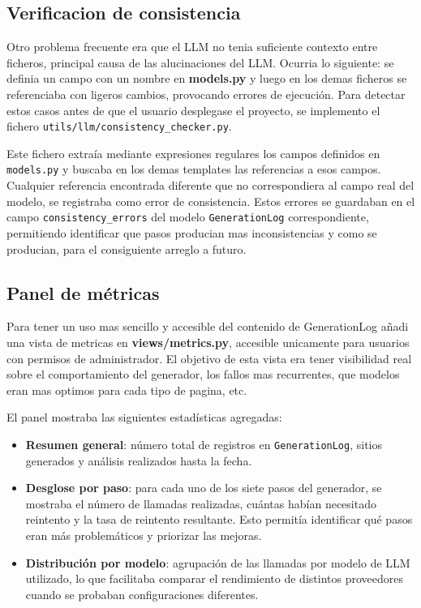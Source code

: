 \subsection{Verificacion de consistencia}
\label{subsec:verificacion-consistencia}

Otro problema frecuente era que el LLM no tenia suficiente contexto entre ficheros, principal causa de las alucinaciones del LLM. Ocurria lo siguiente:
se definia un campo con un nombre en \textbf{models.py} y luego en los demas ficheros se referenciaba con ligeros cambios, provocando errores de ejecución.
Para detectar estos casos antes de que el usuario desplegase el proyecto, se implemento el fichero \texttt{utils/llm/consistency\_checker.py}.

Este fichero extraía mediante expresiones regulares los campos definidos en \texttt{models.py} y buscaba en los demas templates las referencias a esos campos. Cualquier referencia encontrada diferente que no correspondiera al campo real del modelo, se registraba como error de consistencia. 
Estos errores se guardaban en el campo \texttt{consistency\_errors} del modelo \texttt{GenerationLog} correspondiente, permitiendo identificar que pasos producian mas inconsistencias y como se producian, para el consiguiente arreglo a futuro.


\subsection{Panel de métricas}
\label{subsec:panel-metricas}

Para tener un uso mas sencillo y accesible del contenido de GenerationLog añadi una vista de metricas en \textbf{views/metrics.py}, accesible unicamente para usuarios con permisos de administrador. El objetivo de esta vista era tener visibilidad real sobre el comportamiento del generador, los fallos mas recurrentes, que modelos eran mas optimos para cada tipo de pagina, etc.

El panel mostraba las siguientes estadísticas agregadas:

\begin{itemize}
    \item \textbf{Resumen general}: número total de registros en \texttt{GenerationLog}, sitios generados y análisis realizados hasta la fecha.
    \item \textbf{Desglose por paso}: para cada uno de los siete pasos del generador, se mostraba el número de llamadas realizadas, cuántas habían necesitado reintento y la tasa de reintento resultante. Esto permitía identificar qué pasos eran más problemáticos y priorizar las mejoras.
    \item \textbf{Distribución por modelo}: agrupación de las llamadas por modelo de LLM utilizado, lo que facilitaba comparar el rendimiento de distintos proveedores cuando se probaban configuraciones diferentes.
\end{itemize}

